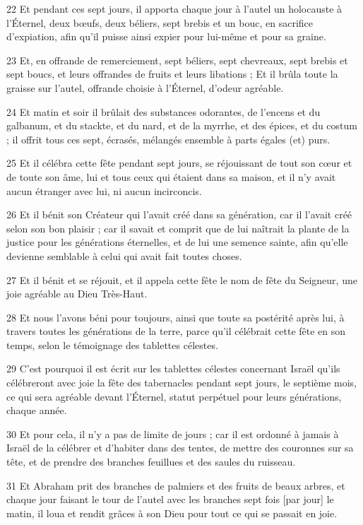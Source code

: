 \par 22 Et pendant ces sept jours, il apporta chaque jour à l'autel un holocauste à l'Éternel, deux bœufs, deux béliers, sept brebis et un bouc, en sacrifice d'expiation, afin qu'il puisse ainsi expier pour lui-même et pour sa graine.
\par 23 Et, en offrande de remerciement, sept béliers, sept chevreaux, sept brebis et sept boucs, et leurs offrandes de fruits et leurs libations ; Et il brûla toute la graisse sur l'autel, offrande choisie à l'Éternel, d'odeur agréable.
\par 24 Et matin et soir il brûlait des substances odorantes, de l'encens et du galbanum, et du stackte, et du nard, et de la myrrhe, et des épices, et du costum ; il offrit tous ces sept, écrasés, mélangés ensemble à parts égales (et) purs.
\par 25 Et il célébra cette fête pendant sept jours, se réjouissant de tout son cœur et de toute son âme, lui et tous ceux qui étaient dans sa maison, et il n'y avait aucun étranger avec lui, ni aucun incirconcis.
\par 26 Et il bénit son Créateur qui l'avait créé dans sa génération, car il l'avait créé selon son bon plaisir ; car il savait et comprit que de lui naîtrait la plante de la justice pour les générations éternelles, et de lui une semence sainte, afin qu'elle devienne semblable à celui qui avait fait toutes choses.
\par 27 Et il bénit et se réjouit, et il appela cette fête le nom de fête du Seigneur, une joie agréable au Dieu Très-Haut.
\par 28 Et nous l'avons béni pour toujours, ainsi que toute sa postérité après lui, à travers toutes les générations de la terre, parce qu'il célébrait cette fête en son temps, selon le témoignage des tablettes célestes.
\par 29 C'est pourquoi il est écrit sur les tablettes célestes concernant Israël qu'ils célébreront avec joie la fête des tabernacles pendant sept jours, le septième mois, ce qui sera agréable devant l'Éternel, statut perpétuel pour leurs générations, chaque année.
\par 30 Et pour cela, il n'y a pas de limite de jours ; car il est ordonné à jamais à Israël de la célébrer et d'habiter dans des tentes, de mettre des couronnes sur sa tête, et de prendre des branches feuillues et des saules du ruisseau.
\par 31 Et Abraham prit des branches de palmiers et des fruits de beaux arbres, et chaque jour faisant le tour de l'autel avec les branches sept fois [par jour] le matin, il loua et rendit grâces à son Dieu pour tout ce qui se passait en joie.


